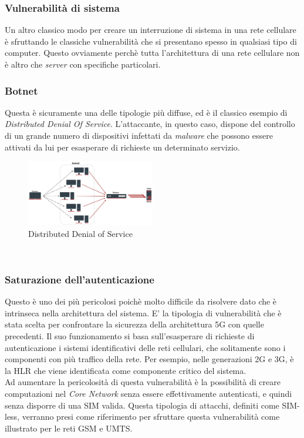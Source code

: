 \subsubsection{Vulnerabilità di sistema}
Un altro classico modo per creare un interruzione di sistema in una rete cellulare è sfruttando le classiche vulnerabilità che si presentano spesso in qualsiasi tipo di computer.
Questo ovviamente perchè tutta l'architettura di una rete cellulare non è altro che \textit{server} con specifiche particolari.

\clearpage

\subsubsection{Botnet}
Questa è sicuramente una delle tipologie più diffuse, ed è il classico esempio di \textit{Distributed Denial Of Service}. L'attaccante, in questo caso, dispone del controllo di 
un grande numero di dispositivi infettati da \textit{malware} che possono essere attivati da lui per esasperare di richieste un determinato servizio.
\begin{figure}[h]
    \centering
    \includegraphics[width=0.5\textwidth]{images/ddos.jpg}
    \caption{Distributed Denial of Service}
\end{figure}\\

\subsubsection{Saturazione dell'autenticazione}
Questo è uno dei più pericolosi poichè molto difficile da risolvere dato che è intrinseca nella architettura del sistema.
E' la tipologia di vulnerabilità che è stata scelta per confrontare la sicurezza della architettura 5G con quelle precedenti.
Il suo funzionamento si basa sull'esasperare di richieste di autenticazione i sistemi identificativi delle reti cellulari, che solitamente 
sono i componenti con più traffico della rete. Per esempio, nelle generazioni 2G e 3G, è la HLR che viene identificata come componente critico del
sistema.\\
Ad aumentare la pericolosità di questa vulnerabilità è la possibilità di creare computazioni nel \textit{Core Network} senza essere effettivamente autenticati, e quindi 
senza disporre di una SIM valida. Questa tipologia di attacchi, definiti come SIM-less, verranno presi come riferimento per sfruttare questa vulnerabilità come illustrato per le 
reti GSM\cite{gsm-dos-simless} e UMTS\cite{umts-dos}.


